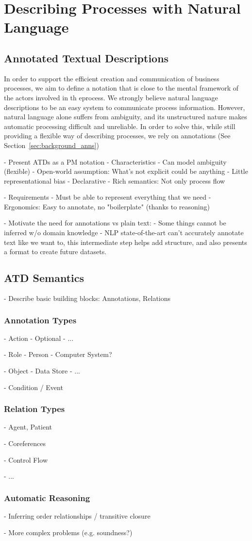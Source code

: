 \chapter{Describing Processes with Natural Language}
\label{cha:atd}

\section{Annotated Textual Descriptions}

In order to support the efficient creation and communication of business
processes, we aim to define a notation that is close to the mental framework of
the actors involved in th eprocess. We strongly believe natural language
descriptions to be an easy system to communicate process information. However,
natural language alone suffers from ambiguity, and its unstructured nature
makes automatic processing difficult and unreliable. In order to solve this,
while still providing a flexible way of describing processes, we rely on
annotations (See Section~\ref{sec:background_anns})


- Present ATDs as a PM notation
- Characteristics
  - Can model ambiguity (flexible)
  - Open-world assumption: What's not explicit could be anything
  - Little representational bias 
  - Declarative 
  - Rich semantics: Not only process flow
  
- Requirements
  - Must be able to represent everything that we need
  - Ergonomics: Easy to annotate, no "boilerplate" (thanks to reasoning)

- Motivate the need for annotations vs plain text:
  - Some things cannot be inferred w/o domain knowledge
  - NLP state-of-the-art can't accurately annotate text like we want to, this
  intermediate step helps add structure, and also presents a format to create
  future datasets.

\section{ATD Semantics}

- Describe basic building blocks: Annotations, Relations
  
\subsection{Annotation Types}

- Action
  - Optional
  - ...
 
- Role
  - Person
  - Computer System?

- Object
  - Data Store
  - ...

- Condition / Event


\subsection{Relation Types}

- Agent, Patient

- Coreferences

- Control Flow

- ...

\subsection{Automatic Reasoning}

- Inferring order relationships / transitive closure

- More complex problems (e.g. soundness?)


